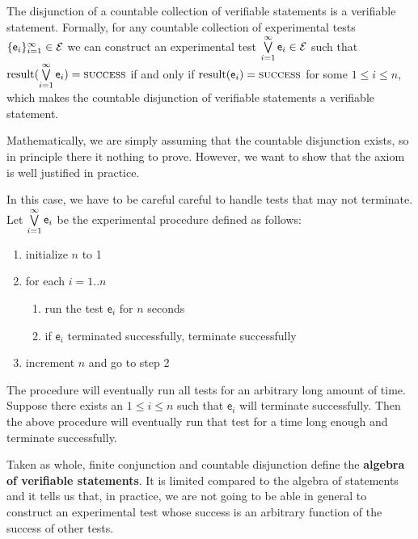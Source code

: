 \documentclass[11pt,letterpaper,fleqn]{memoir} %
\begin{document}
\begin{mathSection}
	\begin{axiom}\label{def_experimental_test_OR}
	The disjunction of a countable collection of verifiable statements is a verifiable statement. Formally, for any countable collection of experimental tests $\{\mathsf{e}_i\}_{i=1}^{\infty} \in \mathcal{E}$ we can construct an experimental test $ \bigvee\limits_{i=1}^{\infty} \mathsf{e}_i \in \mathcal{E}$ such that $\operatorname{result}(\bigvee\limits_{i=1}^{\infty} \mathsf{e}_i) = \textsc{success}$ if and only if $\operatorname{result}(\mathsf{e}_i) = \textsc{success}$ for some $1 \leq i \leq n$, which makes the countable disjunction of verifiable statements a verifiable statement.
	\end{axiom}
	\begin{justification}
		Mathematically, we are simply assuming that the countable disjunction exists, so in principle there it nothing to prove. However, we want to show that the axiom is well justified in practice.
		
		In this case, we have to be careful careful to handle tests that may not terminate.
		Let $\bigvee\limits_{i=1}^{\infty} \mathsf{e}_i$ be the experimental procedure defined as follows:
		\begin{enumerate}
			\item initialize $n$ to 1
			\item for each $i=1..n$
			\begin{enumerate}
				\item run the test $\mathsf{e}_i$ for $n$ seconds
				\item if $\mathsf{e}_i$ terminated successfully, terminate successfully
			\end{enumerate}
			\item increment $n$ and go to step 2
		\end{enumerate}
		The procedure will eventually run all tests for an arbitrary long amount of time. Suppose there exists an $1 \leq i \leq n$ such that $\mathsf{e}_i$ will terminate successfully. Then the above procedure will eventually run that test for a time long enough and terminate successfully.
	\end{justification}
\end{mathSection}

Taken as whole, finite conjunction and countable disjunction define the \textbf{algebra of verifiable statements}. It is limited compared to the algebra of statements and it tells us that, in practice, we are not going to be able in general to construct an experimental test whose success is an arbitrary function of the success of other tests.
\end{document}
